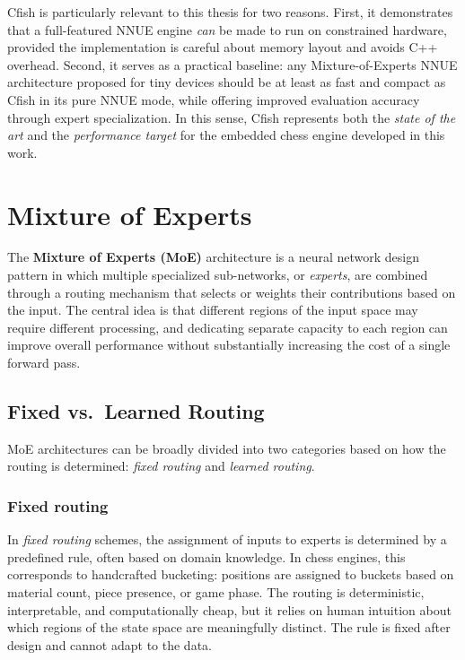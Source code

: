 Cfish is particularly relevant to this thesis for two reasons. First, it demonstrates that a full-featured NNUE engine \emph{can} be made to run on constrained hardware, provided the implementation is careful about memory layout and avoids C++ overhead. Second, it serves as a practical baseline: any Mixture-of-Experts NNUE architecture proposed for tiny devices should be at least as fast and compact as Cfish in its pure NNUE mode, while offering improved evaluation accuracy through expert specialization. In this sense, Cfish represents both the \emph{state of the art} and the \emph{performance target} for the embedded chess engine developed in this work.

\section{Mixture of Experts}\label{sec:moe}

The \textbf{Mixture of Experts (MoE)} architecture is a neural network design pattern in which multiple specialized sub-networks, or \emph{experts}, are combined through a routing mechanism that selects or weights their contributions based on the input. The central idea is that different regions of the input space may require different processing, and dedicating separate capacity to each region can improve overall performance without substantially increasing the cost of a single forward pass.

\subsection{Fixed vs.\ Learned Routing}\label{sec:routing}

MoE architectures can be broadly divided into two categories based on how the routing is determined: \emph{fixed routing} and \emph{learned routing}.

\subsubsection{Fixed routing}\label{sec:fixed-routing}

In \emph{fixed routing} schemes, the assignment of inputs to experts is determined by a predefined rule, often based on domain knowledge. In chess engines, this corresponds to handcrafted bucketing: positions are assigned to buckets based on material count, piece presence, or game phase. The routing is deterministic, interpretable, and computationally cheap, but it relies on human intuition about which regions of the state space are meaningfully distinct. The rule is fixed after design and cannot adapt to the data.

